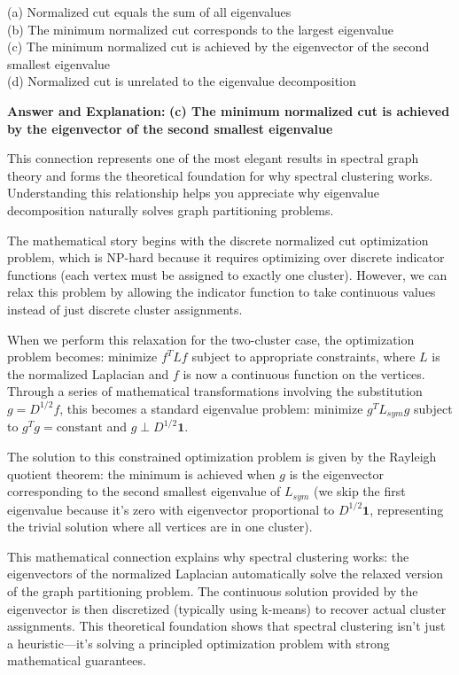\documentclass[11pt]{article}
\newenvironment{answer}{\color{answercolor}\begin{framed}\textbf{Answer and Explanation:}}{\end{framed}}
\begin{document}
(a) Normalized cut equals the sum of all eigenvalues \\
(b) The minimum normalized cut corresponds to the largest eigenvalue \\
(c) The minimum normalized cut is achieved by the eigenvector of the second smallest eigenvalue \\
(d) Normalized cut is unrelated to the eigenvalue decomposition

\begin{answer}
\textbf{(c) The minimum normalized cut is achieved by the eigenvector of the second smallest eigenvalue}

This connection represents one of the most elegant results in spectral graph theory and forms the theoretical foundation for why spectral clustering works. Understanding this relationship helps you appreciate why eigenvalue decomposition naturally solves graph partitioning problems.

The mathematical story begins with the discrete normalized cut optimization problem, which is NP-hard because it requires optimizing over discrete indicator functions (each vertex must be assigned to exactly one cluster). However, we can relax this problem by allowing the indicator function to take continuous values instead of just discrete cluster assignments.

When we perform this relaxation for the two-cluster case, the optimization problem becomes: minimize $f^T L f$ subject to appropriate constraints, where $L$ is the normalized Laplacian and $f$ is now a continuous function on the vertices. Through a series of mathematical transformations involving the substitution $g = D^{1/2}f$, this becomes a standard eigenvalue problem: minimize $g^T L_{sym} g$ subject to $g^T g = \text{constant}$ and $g \perp D^{1/2}\mathbf{1}$.

The solution to this constrained optimization problem is given by the Rayleigh quotient theorem: the minimum is achieved when $g$ is the eigenvector corresponding to the second smallest eigenvalue of $L_{sym}$ (we skip the first eigenvalue because it's zero with eigenvector proportional to $D^{1/2}\mathbf{1}$, representing the trivial solution where all vertices are in one cluster).

This mathematical connection explains why spectral clustering works: the eigenvectors of the normalized Laplacian automatically solve the relaxed version of the graph partitioning problem. The continuous solution provided by the eigenvector is then discretized (typically using k-means) to recover actual cluster assignments. This theoretical foundation shows that spectral clustering isn't just a heuristic—it's solving a principled optimization problem with strong mathematical guarantees.
\end{answer}
\end{document}
